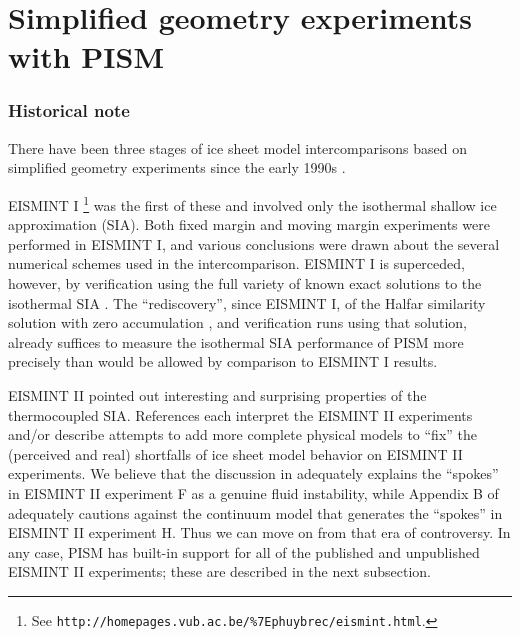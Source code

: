 \documentclass[11pt,final]{amsart}
\begin{document}
\clearpage\newpage
\section{Simplified geometry experiments with PISM}\label{sect:simp}

\subsubsection*{Historical note}  There have been three stages of ice sheet model intercomparisons based on simplified geometry experiments since the early 1990s \cite{BuelerSpray}.

EISMINT I \cite[ European Ice Sheet Modeling INiTiative]{EISMINT96}\footnote{See \texttt{http://homepages.vub.ac.be/\%7Ephuybrec/eismint.html}.} was the first of these and involved only the isothermal shallow ice approximation (SIA).  Both fixed margin and moving margin experiments were performed in EISMINT I, and various conclusions were drawn about the several numerical schemes used in the intercomparison.  EISMINT I is superceded, however, by verification using the full variety of known exact solutions to the isothermal SIA \cite{BLKCB}.  The ``rediscovery'', since EISMINT I, of the Halfar similarity solution with zero accumulation \cite{Halfar83}, and verification runs using that solution, already suffices to measure the isothermal SIA performance of PISM more precisely than would be allowed by comparison to EISMINT I results.

EISMINT II \cite{EISMINT00} pointed out interesting and surprising properties of the thermocoupled SIA.  References \cite{BBL,Hindmarsh04,Hindmarsh06,PayneBaldwin,SaitoEISMINT,BBssasliding} each interpret the EISMINT II experiments and/or describe attempts to add more complete physical models to ``fix'' the (perceived and real) shortfalls of ice sheet model behavior on EISMINT II experiments.  We believe that the discussion in \cite{PayneDongelmans,PayneBaldwin,BBL} adequately explains the ``spokes'' in EISMINT II experiment F as a genuine fluid instability, while Appendix B of \cite{BBssasliding} adequately cautions against the continuum model that generates the ``spokes'' in EISMINT II experiment H.   Thus we can move on from that era of controversy.  In any case, PISM has built-in support for all of the published and unpublished EISMINT II experiments; these are described in the next subsection.
\end{document}

